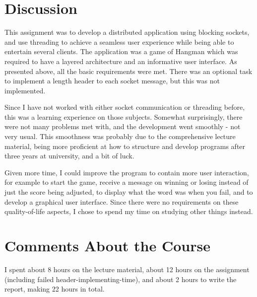 \documentclass[a4paper]{scrartcl}
\begin{document}
\section{Discussion}

This assignment was to develop a distributed application using blocking sockets, and use threading to achieve a seamless user experience while being able to entertain several clients. The application was a game of Hangman which was required to have a layered architecture and an informative user interface. As presented above, all the basic requirements were met. There was an optional task to implement a length header to each socket message, but this was not implemented.

Since I have not worked with either socket communication or threading before, this was a learning experience on those subjects. Somewhat surprisingly, there were not many problems met with, and the development went smoothly - not very usual. This smoothness was probably due to the comprehensive lecture material, being more proficient at how to structure and develop programs after three years at university, and a bit of luck.

Given more time, I could improve the program to contain more user interaction, for example to start the game, receive a message on winning or losing instead of just the score being adjusted, to display what the word was when you fail, and to develop a graphical user interface. Since there were no requirements on these quality-of-life aspects, I chose to spend my time on studying other things instead.

\section{Comments About the Course}

I spent about 8 hours on the lecture material, about 12 hours on the assignment (including failed header-implementing-time), and about 2 hours to write the report, making 22 hours in total.
\end{document}
